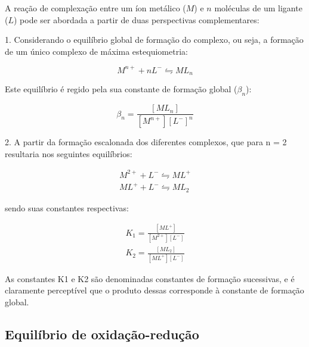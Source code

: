 \begin{definition}
    A reação de complexação entre um íon metálico ($M$) e $n$ moléculas de um ligante ($L$) pode ser abordada a partir de duas perspectivas complementares:

    1. Considerando o equilíbrio global de formação do complexo, ou seja, a formação de um único complexo de máxima estequiometria:

    \[ M^{n+} + nL^- \leftrightharpoons ML_n \]

    Este equilíbrio é regido pela sua constante de formação global ($\beta_n$):

    \[
        \beta_n = \frac{[ML_n]}{[M^{n+}][L^-]^n}
    \]

    2. A partir da formação escalonada dos diferentes complexos, que para n = 2 resultaria nos seguintes equilíbrios:

    \begin{gather}
        M^{2+} + L^- \leftrightharpoons ML^+ \\
        ML^+ + L^- \leftrightharpoons ML_2
    \end{gather}

    sendo suas constantes respectivas:

    \begin{gather}
        K_1 = \frac{[ML^+]}{[M^{2+}][L^-]} \\
        K_2 = \frac{[ML_2]}{[ML^+][L^-]}
    \end{gather}

    As constantes K1 e K2 são denominadas constantes de formação sucessivas, e é claramente perceptível que o produto dessas corresponde à constante de formação global.

\end{definition}

\subsection*{Equilíbrio de oxidação-redução}

